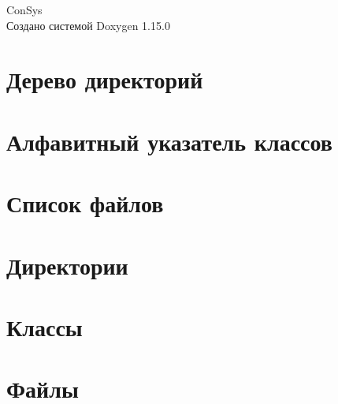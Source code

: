 \documentclass[twoside]{book}
\newcommand{\+}{\discretionary{\mbox{\scriptsize$\hookleftarrow$}}{}{}}
\newcommand{\clearemptydoublepage}{%
    \newpage{\pagestyle{empty}\cleardoublepage}%
  }
\begin{document}
  \raggedbottom
    \hypersetup{pageanchor=false,
                bookmarksnumbered=true,
                pdfencoding=unicode
               }
  \begin{titlepage}
  \vspace*{7cm}
  \begin{center}%
  {\Large Con\+Sys}\\
  \vspace*{1cm}
  {\large Создано системой Doxygen 1.15.0}\\
  \end{center}
  \end{titlepage}
  \clearemptydoublepage
  \tableofcontents
  \clearemptydoublepage
  \hypersetup{pageanchor=true}
\chapter{Дерево директорий}

\chapter{Алфавитный указатель классов}

\chapter{Список файлов}

\chapter{Директории}

\chapter{Классы}








\chapter{Файлы}








  \backmatter
  \newpage
  \clearemptydoublepage
  \printindex
\end{document}
